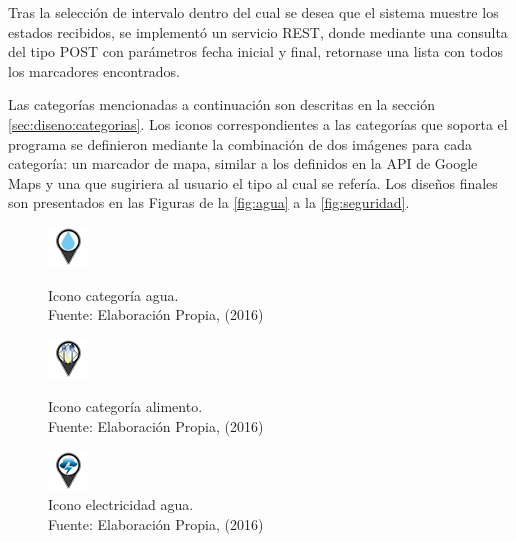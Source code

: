 Tras la selección de intervalo dentro del cual se desea que el sistema muestre los estados recibidos, se implementó un servicio REST, donde mediante una consulta del tipo POST con parámetros fecha inicial y final, retornase una lista con todos los marcadores encontrados.

Las categorías mencionadas a continuación son descritas en la sección \ref{sec:diseno:categorias}. Los iconos correspondientes a las categorías que soporta el programa se definieron mediante la combinación de dos imágenes para cada categoría: un marcador de mapa, similar a los definidos en la API de Google Maps y una que sugiriera al usuario el tipo al cual se refería. Los diseños finales son presentados en las Figuras de la \ref{fig:agua} a la \ref{fig:seguridad}.

\begin{figure}[!htb]
	\centering
	\captionsetup{justification=centering}
	\includegraphics[scale=1]{images/categorias/agua.png}
	\caption[Icono categoría agua.]{Icono categoría agua.\\Fuente: Elaboración Propia, (2016)}
	\label{fig:agua}
	\endminipage\hfill
	\centering
	\captionsetup{justification=centering}
	\includegraphics[scale=1]{images/categorias/alimento.png}
	\caption[Icono categoría alimento.]{Icono categoría alimento.\\Fuente: Elaboración Propia, (2016)}
	\label{fig:alimento}
	\endminipage\hfill
	\centering
	\captionsetup{justification=centering}
	\includegraphics[scale=1]{images/categorias/electricidad.png}
	\caption[Icono categoría electricidad.]{Icono electricidad agua.\\Fuente: Elaboración Propia, (2016)}
	\label{fig:electricidad}
	\endminipage\hfill
\end{figure}

